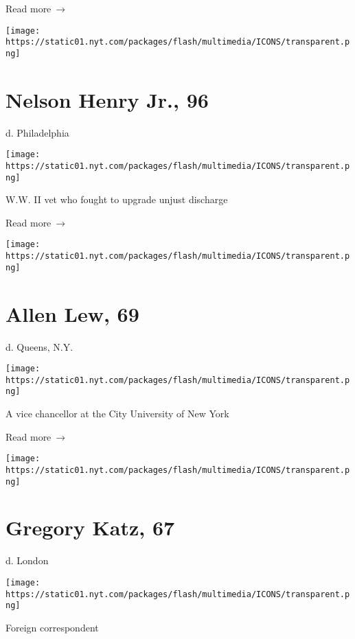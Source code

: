  Read more~→

\href{https://www.nytimes.com/2020/07/01/obituaries/nelson-henry-dead-coronavirus.html}{}

\texttt{[image: https://static01.nyt.com/packages/flash/multimedia/ICONS/transparent.png]}

\hypertarget{nelson-henry-jr-96}{%
\section{Nelson Henry Jr., 96}\label{nelson-henry-jr-96}}

d. Philadelphia

\texttt{[image: https://static01.nyt.com/packages/flash/multimedia/ICONS/transparent.png]}

W.W. II vet who fought to upgrade unjust discharge

 Read more~→

\href{https://www.nytimes.com/2020/07/01/obituaries/allen-lew-dead-coronavirus.html}{}

\texttt{[image: https://static01.nyt.com/packages/flash/multimedia/ICONS/transparent.png]}

\hypertarget{allen-lew-69}{%
\section{Allen Lew, 69}\label{allen-lew-69}}

d. Queens, N.Y.

\texttt{[image: https://static01.nyt.com/packages/flash/multimedia/ICONS/transparent.png]}

A vice chancellor at the City University of New York

 Read more~→

\href{https://www.nytimes.com/2020/07/01/obituaries/gregory-katz-dead-coronavirus.html}{}

\texttt{[image: https://static01.nyt.com/packages/flash/multimedia/ICONS/transparent.png]}

\hypertarget{gregory-katz-67}{%
\section{Gregory Katz, 67}\label{gregory-katz-67}}

d. London

\texttt{[image: https://static01.nyt.com/packages/flash/multimedia/ICONS/transparent.png]}

Foreign correspondent


